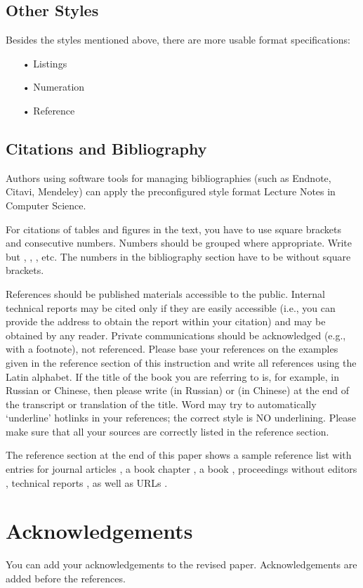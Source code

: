\documentclass{llncs}
\begin{document}
\subsection{Other Styles}
Besides the styles mentioned above, there are more usable format specifications:
\begin{itemize}
    \item[•] Listings
    \item[•] Numeration
    \item[•] Reference 
\end{itemize}

\subsection{Citations and Bibliography}
Authors using software tools for managing bibliographies (such as Endnote, Citavi, Mendeley) can apply the preconfigured style format Lecture Notes in Computer Science.

For citations of tables and figures in the text, you have to use square brackets and consecutive numbers. 
Numbers should be grouped where appropriate. 
Write \cite{smith1981identification,may2006zib,foster1999grid,czajkowski2001grid,foster2002physiology} 
but \cite{smith1981identification}, \cite{foster1999grid}, \cite{foster2002physiology}, etc. 
The numbers in the bibliography section have to be without square brackets. 

References should be published materials accessible to the public. 
Internal technical reports may be cited only if they are easily accessible (i.e., you can provide the address to obtain the report within your citation) and may be obtained by any reader. 
Private communications should be acknowledged (e.g., with a footnote), not referenced. 
Please base your references on the examples given in the reference section of this instruction and write all references using the Latin alphabet.
If the title of the book you are referring to is, for example, in Russian or Chinese, then please write (in Russian) or (in Chinese) at the end of the transcript or translation of the title. 
Word may try to automatically ‘underline’ hotlinks in your references; the correct style is NO underlining. 
Please make sure that all your sources are correctly listed in the reference section.

The reference section at the end of this paper shows a sample reference list with entries for journal articles \cite{smith1981identification}, 
a book chapter \cite{may2006zib}, 
a book \cite{foster1999grid}, 
proceedings without editors \cite{czajkowski2001grid}, 
technical reports \cite{foster2002physiology}, 
as well as URLs \cite{ncb}. 

\section{Acknowledgements}
You can add your acknowledgements to the revised paper. Acknowledgements are added before the references.




\end{document}
